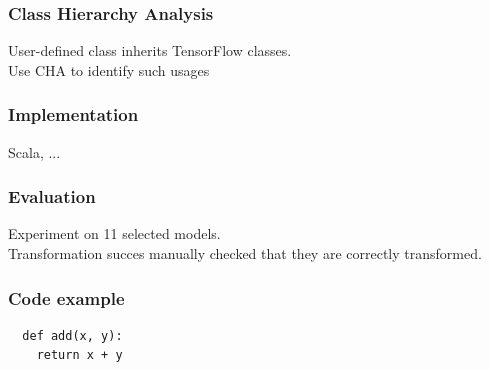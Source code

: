 \documentclass{beamer}
\begin{document}
\begin{frame}
  \frametitle{Class Hierarchy Analysis}
  User-defined class inherits TensorFlow classes.\\
  Use CHA to identify such usages
\end{frame}


\begin{frame}
  \frametitle{Implementation}
  Scala, ...
\end{frame}


\begin{frame}
  \frametitle{Evaluation}
  Experiment on 11 selected models.\\
  Transformation succes
  manually checked that they are correctly transformed.\\
\end{frame}


\begin{frame}[fragile]
  \frametitle{Code example}
  \begin{verbatim}
  def add(x, y):
    return x + y
  \end{verbatim}
\end{frame}
\end{document}
